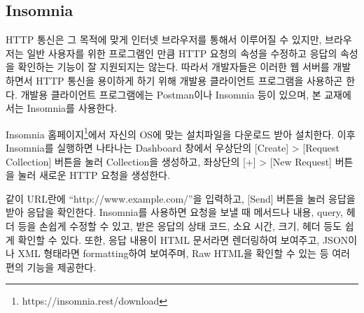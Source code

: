 \subsection*{Insomnia}

HTTP 통신은 그 목적에 맞게 인터넷 브라우저를 통해서 이루어질 수 있지만, 브라우저는 일반 사용자를 위한 프로그램인 만큼 HTTP 요청의 속성을 수정하고 응답의 속성을 확인하는 기능이 잘 지원되지는 않는다. 따라서 개발자들은 이러한 웹 서버를 개발하면서 HTTP 통신을 용이하게 하기 위해 개발용 클라이언트 프로그램을 사용하곤 한다. 개발용 클라이언트 프로그램에는 Postman이나 Insomnia 등이 있으며, 본 교재에서는 Insomnia를 사용한다.

Insomnia 홈페이지\footnote{https://insomnia.rest/download}에서 자신의 OS에 맞는 설치파일을 다운로드 받아 설치한다. 이후 Insomnia를 실행하면 나타나는 Dashboard 창에서 우상단의 [Create] \textgreater{} [Request Collection] 버튼을 눌러 Collection을 생성하고, 좌상단의 [+] \textgreater{} [New Request] 버튼을 눌러 새로운 HTTP 요청을 생성한다.

    {}

\와 같이 URL란에 ``http://www.example.com/''을 입력하고, [Send] 버튼을 눌러 응답을 받아 응답을 확인한다. Insomnia를 사용하면 요청을 보낼 때 메서드나 내용, query, 헤더 등을 손쉽게 수정할 수 있고, 받은 응답의 상태 코드, 소요 시간, 크기, 헤더 등도 쉽게 확인할 수 있다. 또한, 응답 내용이 HTML 문서라면 렌더링하여 보여주고, JSON이나 XML 형태라면 formatting하여 보여주며, Raw HTML을 확인할 수 있는 등 여러 편의 기능을 제공한다.
